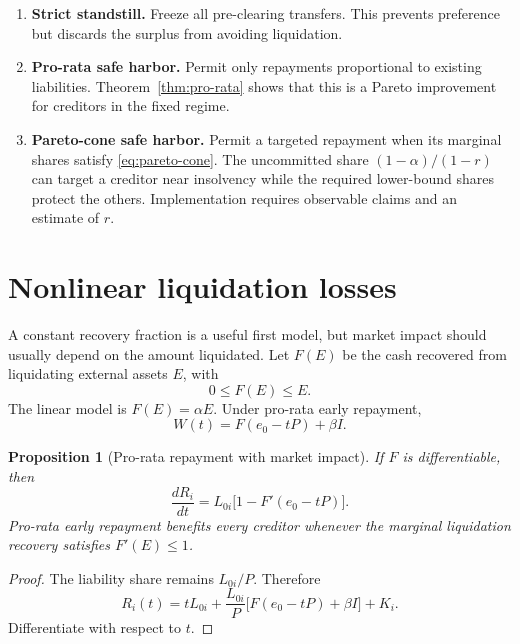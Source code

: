 \documentclass[11pt]{article}
\newtheorem{proposition}[theorem]{Proposition}
\theoremstyle{definition}
\theoremstyle{remark}
\begin{document}
\begin{enumerate}[label=(\alph*)]
  \item \textbf{Strict standstill.}  Freeze all pre-clearing transfers.  This
  prevents preference but discards the surplus from avoiding liquidation.

  \item \textbf{Pro-rata safe harbor.}  Permit only repayments proportional to
  existing liabilities.  Theorem~\ref{thm:pro-rata} shows that this is a Pareto
  improvement for creditors in the fixed regime.

  \item \textbf{Pareto-cone safe harbor.}  Permit a targeted repayment when its
  marginal shares satisfy \eqref{eq:pareto-cone}.  The uncommitted share
  $(1-\alpha)/(1-r)$ can target a creditor near insolvency while the required
  lower-bound shares protect the others.  Implementation requires observable
  claims and an estimate of $r$.
\end{enumerate}

\section{Nonlinear liquidation losses}

A constant recovery fraction is a useful first model, but market impact should
usually depend on the amount liquidated.  Let $F(E)$ be the cash recovered from
liquidating external assets $E$, with
\begin{equation}
  0\leq F(E)\leq E.
\end{equation}
The linear model is $F(E)=\alpha E$.  Under pro-rata early repayment,
\begin{equation}
  W(t)=F(e_0-tP)+\beta I.
\end{equation}

\begin{proposition}[Pro-rata repayment with market impact]
If $F$ is differentiable, then
\begin{equation}
  \frac{dR_i}{dt}
  =L_{0i}\bigl[1-F'(e_0-tP)\bigr].
\end{equation}
Pro-rata early repayment benefits every creditor whenever the marginal
liquidation recovery satisfies $F'(E)\leq1$.
\end{proposition}

\begin{proof}
The liability share remains $L_{0i}/P$.  Therefore
\begin{equation}
  R_i(t)
  =tL_{0i}
   +\frac{L_{0i}}{P}
      \bigl[F(e_0-tP)+\beta I\bigr]+K_i.
\end{equation}
Differentiate with respect to $t$.
\end{proof}
\end{document}
